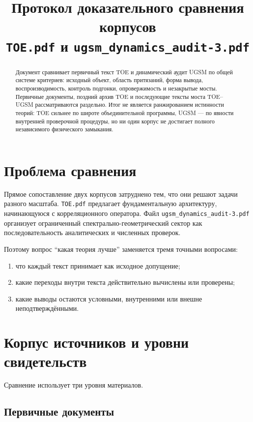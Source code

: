 \documentclass[12pt,a4paper]{article}
\title{Протокол доказательного сравнения корпусов\\
\texttt{TOE.pdf} и \texttt{ugsm\_dynamics\_audit-3.pdf}}
\author{}
\date{}
\begin{document}
\maketitle

\begin{abstract}
Документ сравнивает первичный текст TOE и динамический аудит UGSM по общей
системе критериев: исходный объект, область притязаний, форма вывода,
воспроизводимость, контроль подгонки, опровержимость и незакрытые мосты.
Первичные документы, поздний архив TOE и последующие тексты моста TOE--UGSM
рассматриваются раздельно. Итог не является ранжированием истинности теорий:
TOE сильнее по широте объединительной программы, UGSM --- по явности
внутренней проверочной процедуры, но ни один корпус не достигает полного
независимого физического замыкания.
\end{abstract}

\section{Проблема сравнения}

Прямое сопоставление двух корпусов затруднено тем, что они решают задачи
разного масштаба. \texttt{TOE.pdf} предлагает фундаментальную архитектуру,
начинающуюся с корреляционного оператора. Файл
\texttt{ugsm\_dynamics\_audit-3.pdf} организует ограниченный
спектрально-геометрический сектор как последовательность аналитических и
численных проверок.

Поэтому вопрос ``какая теория лучше'' заменяется тремя точными вопросами:
\begin{enumerate}
    \item что каждый текст принимает как исходное допущение;
    \item какие переходы внутри текста действительно вычислены или проверены;
    \item какие выводы остаются условными, внутренними или внешне
    неподтверждёнными.
\end{enumerate}

\section{Корпус источников и уровни свидетельств}

Сравнение использует три уровня материалов.

\subsection{Первичные документы}
\end{document}
